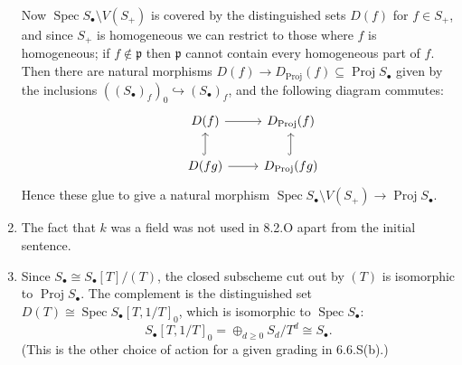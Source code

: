 \documentclass{report}
\newcommand{\p}{\mathfrak{p}}
\DeclareMathOperator{\Spec}{Spec}
\DeclareMathOperator{\Proj}{Proj}
\begin{document}
\begin{enumerate}[label=\textbf{8.2.\Alph*.}]
	      Now $\Spec S_\bullet\setminus V(S_+)$ is covered by the distinguished
	      sets $D(f)$ for $f\in S_+$, and since $S_+$ is homogeneous we can
	      restrict to those where $f$ is homogeneous; if $f\notin\p$ then $\p$
	      cannot contain every homogeneous part of $f$. Then there are natural
	      morphisms $D(f)\to D_{\Proj}(f)\subseteq\Proj S_\bullet$ given by the
	      inclusions $((S_\bullet)_f)_0\hookrightarrow(S_\bullet)_f$, and the
	      following diagram commutes:
	      \begin{equation*}
		      \begin{tikzcd}
			      &D(f) \ar[r] &D_{\Proj}(f) \\
			      &D(fg) \ar[u,hook] \ar[r] &D_{\Proj}(fg) \ar[u,hook]
		      \end{tikzcd}
	      \end{equation*}
	      Hence these glue to give a natural morphism
	      $\Spec S_\bullet\setminus V(S_+)\to\Proj S_\bullet$.

	\item The fact that $k$ was a field was not used in 8.2.O apart from the
	      initial sentence.

	\item Since $S_\bullet\cong S_\bullet[T]/(T)$, the closed subscheme cut
	      out by $(T)$ is isomorphic to $\Proj S_\bullet$. The complement is the
	      distinguished set $D(T)\cong\Spec S_\bullet[T,1/T]_0$, which is
	      isomorphic to $\Spec S_\bullet$:
	      \begin{equation*}
		      S_\bullet[T,1/T]_0 = \oplus_{d\ge0}S_d/T^d \cong S_\bullet.
	      \end{equation*}
	      (This is the other choice of action for a given grading in 6.6.S(b).)
\end{enumerate}
\end{document}
